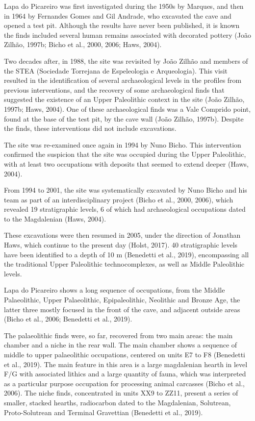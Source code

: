 \documentclass[12pt,twoside]{reedthesis}
\begin{document}
Lapa do Picareiro was first investigated during the 1950s by Marques, and then in 1964 by Fernandes Gomes and Gil Andrade, who excavated the cave and opened a test pit. Although the results have never been published, it is known the finds included several human remains associated with decorated pottery (João Zilhão, 1997b; Bicho et al., 2000, 2006; Haws, 2004).

Two decades after, in 1988, the site was revisited by João Zilhão and members of the STEA (Sociedade Torrejana de Espeleologia e Arqueologia). This visit resulted in the identification of several archaeological levels in the profiles from previous interventions, and the recovery of some archaeological finds that suggested the existence of an Upper Paleolithic context in the site (João Zilhão, 1997b; Haws, 2004). One of these archaeological finds was a Vale Comprido point, found at the base of the test pit, by the cave wall (João Zilhão, 1997b). Despite the finds, these interventions did not include excavations.

The site was re-examined once again in 1994 by Nuno Bicho. This intervention confirmed the suspicion that the site was occupied during the Upper Paleolithic, with at least two occupations with deposits that seemed to extend deeper (Haws, 2004).

From 1994 to 2001, the site was systematically excavated by Nuno Bicho and his team as part of an interdisciplinary project (Bicho et al., 2000, 2006), which revealed 19 stratigraphic levels, 6 of which had archaeological occupations dated to the Magdalenian (Haws, 2004).

These excavations were then resumed in 2005, under the direction of Jonathan Haws, which continue to the present day (Holst, 2017). 40 stratigraphic levels have been identified to a depth of 10 m (Benedetti et al., 2019), encompassing all the traditional Upper Paleolithic technocomplexes, as well as Middle Paleolithic levels.

Lapa do Picareiro shows a long sequence of occupations, from the Middle Palaeolithic, Upper Palaeolithic, Epipaleolithic, Neolithic and Bronze Age, the latter three mostly focused in the front of the cave, and adjacent outside areas (Bicho et al., 2006; Benedetti et al., 2019).

The palaeolithic finds were, so far, recovered from two main areas: the main chamber and a niche in the rear wall. The main chamber shows a sequence of middle to upper palaeolithic occupations, centered on units E7 to F8 (Benedetti et al., 2019). The main feature in this area is a large magdalenian hearth in level F/G with associated lithics and a large quantity of fauna, which was interpreted as a particular purpose occupation for processing animal carcasses (Bicho et al., 2006). The niche finds, concentrated in units XX9 to ZZ11, present a series of smaller, stacked hearths, radiocarbon dated to the Magdalenian, Solutrean, Proto-Solutrean and Terminal Gravettian (Benedetti et al., 2019).
\end{document}
